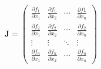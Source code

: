 \documentclass[preview]{standalone}
\begin{document}
\begin{equation*}
\mathbf{J} = 
 \begin{pmatrix}
  \frac{\partial f_1}{\partial x_1} & \frac{\partial f_1}{\partial x_2} & \cdots & \frac{\partial f1}{\partial x_n} \\
  \frac{\partial f_2}{\partial x_1} & \frac{\partial f_2}{\partial x_2} & \cdots & \frac{\partial f_2}{\partial x_n} \\
  \vdots  & \vdots  & \ddots & \vdots  \\
  \frac{\partial f_n}{\partial x_1} & \frac{\partial f_n}{\partial x_2} & \cdots & \frac{\partial f_n}{\partial x_n} 
 \end{pmatrix}
\end{equation*}
\end{document}
